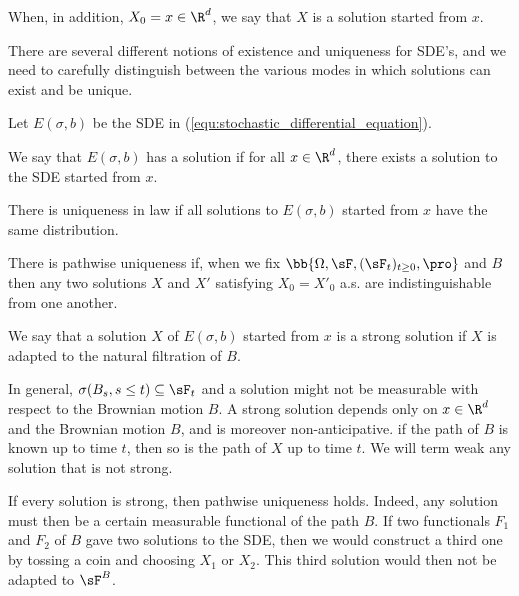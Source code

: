 When, in addition, $X_0 = x \in \R^d$, we say that $X$ is a solution started from $x$. 

There are several different notions of existence and uniqueness for SDE's, and we need to carefully distinguish between the various modes in which solutions can exist and be unique.

\begin{definition}
Let $E(\sigma, b)$ be the SDE in (\ref{equ:stochastic_differential_equation}).
\ben
\item We say that $E(\sigma, b)$ has a solution if for all $x \in\R^d$, there exists a solution to the SDE started from $x$.
\item There is uniqueness in law if all solutions to $E(\sigma, b)$ started from $x$ have the same distribution.
\item There is pathwise uniqueness if, when we fix $\bb{\Omega,\sF, (\sF_t)_{t\geq0},\pro}$ and $B$ then any two solutions $X$ and $X'$ satisfying $X_0 = X'_0$ a.s. are indistinguishable from one another.
\item We say that a solution $X$ of $E(\sigma, b)$ started from $x$ is a strong solution if $X$ is adapted to the natural filtration of $B$.
\een
\end{definition}

\begin{remark}
In general, $\sigma(B_s, s \leq t) \subseteq \sF_t$ and a solution might not be measurable with respect to the Brownian motion $B$. A strong solution depends only on $x \in \R^d$ and the Brownian motion $B$, and is moreover non-anticipative. if the path of $B$ is known up to time $t$, then so is the path of $X$ up to time $t$. We will term weak any solution that is not strong.
\end{remark}

\begin{remark}
If every solution is strong, then pathwise uniqueness holds. Indeed, any solution must then be a certain measurable functional of the path $B$. If two functionals $F_1$ and $F_2$ of $B$ gave two solutions to the SDE, then we would construct a third one by tossing a coin and choosing $X_1$ or $X_2$. This third solution would then not be adapted to $\sF^B$. 
\end{remark}

